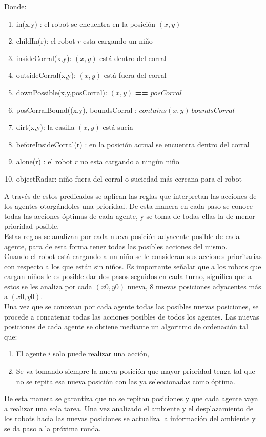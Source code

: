 \documentclass{book}
\begin{document}
	Donde:
	\begin{enumerate}
		\item in(x,y) : el robot se encuentra en la posici\'on $(x,y)$
		\item childIn(r): el robot $r$ esta cargando un ni\~no
		\item insideCorral(x,y): $(x,y)$ est\'a dentro del corral
		\item outsideCorral(x,y): $(x,y)$ est\'a fuera del corral
		\item downPossible(x,y,posCorral): $(x,y)$ \textbf{==} $posCorral$
		\item posCorralBound((x,y), boundsCorral : $contains (x,y) \ boundsCorral$
		\item dirt(x,y): la casilla $(x,y)$ est\'a sucia
		\item beforeInsideCorral(r) : en la posici\'on actual se encuentra dentro del corral
		\item alone(r) : el robot $r$ no esta cargando a ningún ni\~no
		\item objectRadar: ni\~no fuera del corral o suciedad m\'as cercana para el robot
	\end{enumerate}
	
	A trav\'es de estos predicados se aplican las reglas que interpretan las acciones de los agentes otorg\'andoles una prioridad. De esta manera en cada paso se conoce todas las acciones \'optimas de cada agente, y se toma de todas ellas la de menor prioridad posible. \\
	Estas reglas se analizan por cada nueva posici\'on adyacente posible de cada agente, para de esta forma tener todas las posibles acciones del mismo. \\
	Cuando el robot est\'a cargando a un ni\~no se le consideran sus acciones prioritarias con respecto a los que est\'an sin ni\~nos. Es importante se\~nalar que a los robots que cargan ni\~nos le es posible dar dos pasos seguidos en cada turno, significa que a estos se les analiza por cada $(x0,y0)$ nueva, 8 nuevas posiciones adyacentes m\'as a $(x0,y0)$. \\
	Una vez que se conozcan por cada agente todas las posibles nuevas posiciones, se procede a concatenar todas las acciones posibles de todos los agentes. Las nuevas posiciones de cada agente se obtiene mediante un algoritmo de ordenaci\'on tal que:
	\begin{enumerate}
		\item El agente $i$ solo puede realizar una acci\'on,
		\item Se va tomando siempre la nueva posici\'on que mayor prioridad tenga tal que no se repita esa nueva posici\'on con las ya seleccionadas como \'optima.
	\end{enumerate}
	De esta manera se garantiza que no se repitan posiciones y que cada agente vaya a realizar una sola tarea. Una vez analizado el ambiente y el desplazamiento de los robots hacia las nuevas posiciones se actualiza la informaci\'on del ambiente y se da paso a la pr\'oxima ronda.
	
\end{document}

